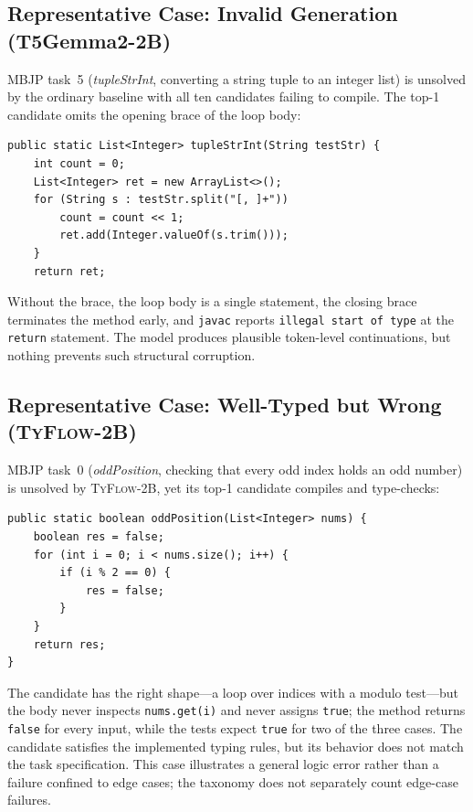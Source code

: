 \documentclass[manuscript,screen]{acmart}
\newcommand{\toolname}[1]{\textsc{#1}}
\newcommand{\mainname}{\toolname{TyFlow}\xspace}
\begin{document}
\subsection{{\color{revblue}Representative Case: Invalid Generation (T5Gemma2-2B)}}

{\color{revblue}MBJP task~5 (}\emph{\color{revblue}tupleStrInt}{\color{revblue}, converting a string tuple to an integer list) is unsolved by the ordinary baseline with all ten candidates failing to compile.
The top-1 candidate omits the opening brace of the loop body:
}\begin{tcolorbox}
\begin{Verbatim}[fontsize=\small]
public static List<Integer> tupleStrInt(String testStr) {
    int count = 0;
    List<Integer> ret = new ArrayList<>();
    for (String s : testStr.split("[, ]+"))
        count = count << 1;
        ret.add(Integer.valueOf(s.trim()));
    }
    return ret;
\end{Verbatim}
\end{tcolorbox}
{\color{revblue}Without the brace, the loop body is a single statement, the closing brace terminates the method early, and }\texttt{\color{revblue}javac} {\color{revblue}reports }\texttt{\color{revblue}illegal start of type} {\color{revblue}at the }\texttt{\color{revblue}return} {\color{revblue}statement.
The model produces plausible token-level continuations, but nothing prevents such structural corruption.
}

\subsection{{\color{revblue}Representative Case: Well-Typed but Wrong (}\mainname{\color{revblue}-2B)}}

{\color{revblue}MBJP task~0 (}\emph{\color{revblue}oddPosition}{\color{revblue}, checking that every odd index holds an odd number) is unsolved by }\mainname{\color{revblue}-2B, yet its top-1 candidate compiles and type-checks:
}\begin{tcolorbox}
\begin{Verbatim}[fontsize=\small]
public static boolean oddPosition(List<Integer> nums) {
    boolean res = false;
    for (int i = 0; i < nums.size(); i++) {
        if (i % 2 == 0) {
            res = false;
        }
    }
    return res;
}
\end{Verbatim}
\end{tcolorbox}
{\color{revblue}The candidate has the right shape---a loop over indices with a modulo test---but the body never inspects }\texttt{\color{revblue}nums.get(i)} {\color{revblue}and never assigns }\texttt{\color{revblue}true}{\color{revblue}; the method returns }\texttt{\color{revblue}false} {\color{revblue}for every input, while the tests expect }\texttt{\color{revblue}true} {\color{revblue}for two of the three cases.
The candidate satisfies the implemented typing rules, but its behavior does not match the task specification. This case illustrates a general logic error rather than a failure confined to edge cases; the taxonomy does not separately count edge-case failures.
}
\end{document}
